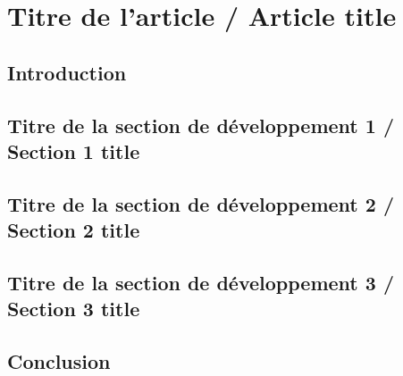 \chapter{Titre de l'article / Article title}
\thispagestyle{empty} %

\section*{\HECtdmResumeArticle}


\section{Introduction}


\section{Titre de la section de d\'{e}veloppement 1 / Section 1 title}


\section{Titre de la section de d\'{e}veloppement 2 / Section 2 title}


\section{Titre de la section de d\'{e}veloppement 3 / Section 3 title}


\section{Conclusion}




